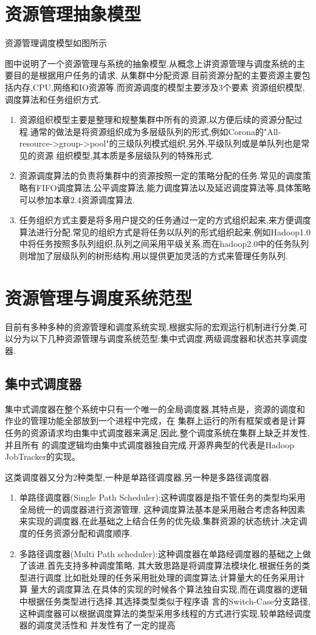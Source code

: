 \section{资源管理抽象模型}
 
资源管理调度模型如图所示

图中说明了一个资源管理与系统的抽象模型.从概念上讲资源管理与调度系统的主要目的是根据用户任务的请求,
从集群中分配资源.目前资源分配的主要资源主要包括内存,CPU,网络和IO资源等.而资源调度的模型主要涉及3个要素
资源组织模型,调度算法和任务组织方式.
\begin{enumerate}
\item 资源组织模型主要是整理和规整集群中所有的资源,以方便后续的资源分配过程.通常的做法是将资源组织成为多层级队列的形式,例如Corona的"All-resource->group->pool"的三级队列模式组织,另外,平级队列或是单队列也是常见的资源
组织模型,其本质是多层级队列的特殊形式.
\item 资源调度算法的负责将集群中的资源按照一定的策略分配的任务.常见的调度策略有FIFO调度算法,公平调度算法,能力调度算法以及延迟调度算法等,具体策略可以参加本章2.4资源调度算法.
\item 任务组织方式主要是将多用户提交的任务通过一定的方式组织起来,来方便调度算法进行分配.常见的组织方式是将任务以队列的形式组织起来,例如Hadoop1.0中将任务按照多队列组织,队列之间采用平级关系,而在hadoop2.0中的任务队列则增加了层级队列的树形结构,用以提供更加灵活的方式来管理任务队列.
\end{enumerate}
\section{资源管理与调度系统范型}
目前有多种多种的资源管理和调度系统实现,根据实际的宏观运行机制进行分类,可以分为以下几种资源管理与调度系统范型:集中式调度,两级调度器和状态共享调度器.

\subsection{集中式调度器}
集中式调度器在整个系统中只有一个唯一的全局调度器,其特点是，资源的调度和作业的管理功能全部放到一个进程中完成，在
集群上运行的所有框架或者是计算任务的资源请求均由集中式调度器来满足,因此,整个调度系统在集群上缺乏并发性,并且所有
的调度逻辑均由集中式调度器独自完成.开源界典型的代表是Hadoop JobTracker的实现。

这类调度器又分为2种类型,一种是单路径调度器,另一种是多路径调度器.
\begin{enumerate}
\item 单路径调度器(Single Path Scheduler):这种调度器是指不管任务的类型均采用全局统一的调度器进行资源管理,
这种调度算法基本是采用融合考虑各种因素来实现的调度器,在此基础之上结合任务的优先级,集群资源的状态统计,决定调度的任务资源分配和调度顺序.
\item 多路径调度器(Multi Path scheduler):这种调度器在单路经调度器的基础之上做了该进,首先支持多种调度策略,
其大致思路是将调度算法模块化,根据任务的类型进行调度,比如批处理的任务采用批处理的调度算法,计算量大的任务采用计算
量大的调度算法,在具体的实现的时候各个算法独自实现,而在调度器的逻辑中根据任务类型进行选择,其选择类型类似于程序语
言的Switch-Case分支路径,这种调度器可以根据调度算法的类型采用多线程的方式进行实现,较单路经调度器的调度灵活性和
并发性有了一定的提高
\end{enumerate}

